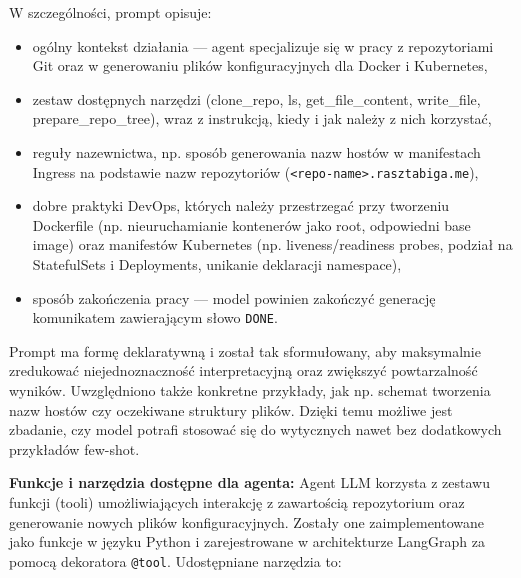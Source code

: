 W szczególności, prompt opisuje:
\begin{itemize}
    \item ogólny kontekst działania — agent specjalizuje się w pracy z repozytoriami Git oraz w generowaniu plików konfiguracyjnych dla Docker i Kubernetes,
    \item zestaw dostępnych narzędzi (clone\_repo, ls, get\_file\_content, write\_file, prepare\_repo\_tree), wraz z instrukcją, kiedy i jak należy z nich korzystać,
    \item reguły nazewnictwa, np. sposób generowania nazw hostów w manifestach Ingress na podstawie nazw repozytoriów (\texttt{<repo-name>.rasztabiga.me}),
    \item dobre praktyki DevOps, których należy przestrzegać przy tworzeniu Dockerfile (np. nieuruchamianie kontenerów jako root, odpowiedni base image) oraz manifestów Kubernetes (np. liveness/readiness probes, podział na StatefulSets i Deployments, unikanie deklaracji namespace),
    \item sposób zakończenia pracy — model powinien zakończyć generację komunikatem zawierającym słowo \texttt{DONE}.
\end{itemize}

Prompt ma formę deklaratywną i został tak sformułowany, aby maksymalnie zredukować niejednoznaczność interpretacyjną oraz zwiększyć powtarzalność wyników. Uwzględniono także konkretne przykłady, jak np. schemat tworzenia nazw hostów czy oczekiwane struktury plików. Dzięki temu możliwe jest zbadanie, czy model potrafi stosować się do wytycznych nawet bez dodatkowych przykładów few-shot.

\bigskip
\noindent
\textbf{Funkcje i narzędzia dostępne dla agenta:}  
Agent LLM korzysta z zestawu funkcji (tooli) umożliwiających interakcję z zawartością repozytorium oraz generowanie nowych plików konfiguracyjnych. Zostały one zaimplementowane jako funkcje w języku Python i zarejestrowane w architekturze LangGraph za pomocą dekoratora \texttt{@tool}. Udostępniane narzędzia to:

